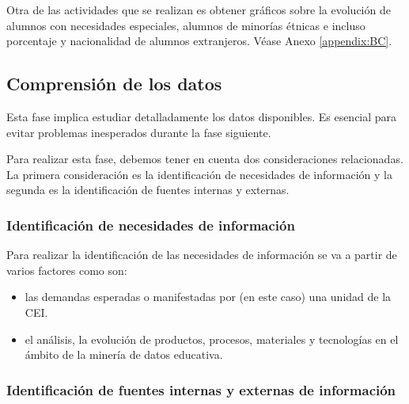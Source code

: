 Otra de las actividades que se realizan es obtener gráficos sobre la evolución de alumnos con necesidades especiales, alumnos de minorías étnicas e incluso porcentaje y nacionalidad de alumnos extranjeros. Véase Anexo \ref{appendix:BC}.

\subsection{Comprensión de los datos}
Esta fase implica estudiar detalladamente los datos disponibles. Es esencial para evitar problemas inesperados durante la fase siguiente.

Para realizar esta fase, debemos tener en cuenta dos consideraciones relacionadas. La primera consideración es la identificación de necesidades de información y la segunda es la identificación de fuentes internas y externas.

\subsubsection{Identificación de necesidades de información}

Para realizar la identificación de las necesidades de información se va a partir de varios factores como son:
\begin{itemize}
	\item las demandas esperadas o manifestadas por (en este caso) una unidad de la CEI.
	\item el análisis, la evolución de productos, procesos, materiales y tecnologías en el ámbito de la minería de datos educativa.
\end{itemize}

\subsubsection{Identificación de fuentes internas y externas de información}


